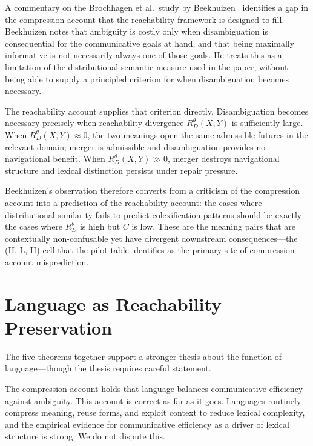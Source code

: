 \documentclass[12pt]{article}
\theoremstyle{rthm}
\theoremstyle{rdef}
\theoremstyle{remark}
\newcommand{\RD}[1][\theta]{R_{D}^{#1}}
\begin{document}
A commentary on the Brochhagen et al.\ study by Beekhuizen~\cite{beekhuizen2026}
identifies a gap in the compression account that the reachability framework is
designed to fill. Beekhuizen notes that ambiguity is costly only when
disambiguation is consequential for the communicative goals at hand, and that
being maximally informative is not necessarily always one of those goals. He
treats this as a limitation of the distributional semantic measure used in the
paper, without being able to supply a principled criterion for when
disambiguation becomes necessary.

The reachability account supplies that criterion directly. Disambiguation becomes
necessary precisely when reachability divergence $\RD(X,Y)$ is sufficiently
large. When $\RD(X,Y) \approx 0$, the two meanings open the same admissible
futures in the relevant domain; merger is admissible and disambiguation provides
no navigational benefit. When $\RD(X,Y) \gg 0$, merger destroys navigational
structure and lexical distinction persists under repair pressure.

Beekhuizen's observation therefore converts from a criticism of the compression
account into a prediction of the reachability account: the cases where
distributional similarity fails to predict colexification patterns should be
exactly the cases where $\RD$ is high but $C$ is low. These are the meaning
pairs that are contextually non-confusable yet have divergent downstream
consequences---the (H, L, H) cell that the pilot table identifies as the primary
site of compression account misprediction.

\section{Language as Reachability Preservation}
\label{sec:language}

The five theorems together support a stronger thesis about the function of
language---though the thesis requires careful statement.

The compression account holds that language balances communicative efficiency
against ambiguity. This account is correct as far as it goes. Languages routinely
compress meaning, reuse forms, and exploit context to reduce lexical complexity,
and the empirical evidence for communicative efficiency as a driver of lexical
structure is strong. We do not dispute this.
\end{document}

